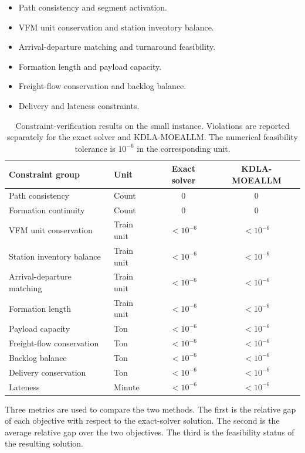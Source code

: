 \documentclass[11pt]{article}
\begin{document}
\begin{itemize}
	\item Path consistency and segment activation.
	\item VFM unit conservation and station inventory balance.
	\item Arrival-departure matching and turnaround feasibility.
	\item Formation length and payload capacity.
	\item Freight-flow conservation and backlog balance.
	\item Delivery and lateness constraints.
\end{itemize}

\begin{table}[!htbp]
	\centering
	\small
	\caption{Constraint-verification results on the small instance. Violations are reported separately for the exact solver and KDLA-MOEALLM. The numerical feasibility tolerance is $10^{-6}$ in the corresponding unit.}
	\label{AppTab:constraintCheck}
	\begin{tabular}{p{}p{}cc}
		\toprule
		\textbf{Constraint group} & \textbf{Unit} & \textbf{Exact solver} & \textbf{KDLA-MOEALLM} \\
		\midrule
		Path consistency & Count & 0 & 0 \\
		Formation continuity & Count & 0 & 0 \\
		VFM unit conservation & Train unit & $<10^{-6}$ & $<10^{-6}$ \\
		Station inventory balance & Train unit & $<10^{-6}$ & $<10^{-6}$ \\
		Arrival-departure matching & Train unit & $<10^{-6}$ & $<10^{-6}$ \\
		Formation length & Train unit & $<10^{-6}$ & $<10^{-6}$ \\
		Payload capacity & Ton & $<10^{-6}$ & $<10^{-6}$ \\
		Freight-flow conservation & Ton & $<10^{-6}$ & $<10^{-6}$ \\
		Backlog balance & Ton & $<10^{-6}$ & $<10^{-6}$ \\
		Delivery conservation & Ton & $<10^{-6}$ & $<10^{-6}$ \\
		Lateness & Minute & $<10^{-6}$ & $<10^{-6}$ \\
		\bottomrule
	\end{tabular}
\end{table}

Three metrics are used to compare the two methods. The first is the relative gap of each objective with respect to the exact-solver solution. The second is the average relative gap over the two objectives. The third is the feasibility status of the resulting solution.
\end{document}
